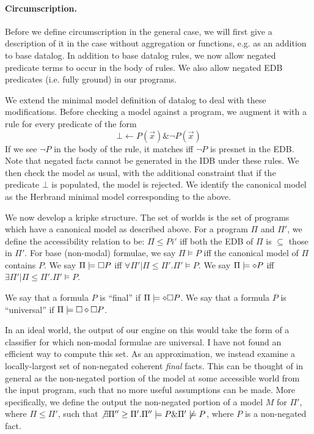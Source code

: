 \paragraph{Circumscription.}
Before we define circumscription in the general case, we will first give a description of it in the case without aggregation or functions, e.g. as an addition to base datalog.
In addition to base datalog rules, we now allow negated predicate terms to occur in the body of rules.
We also allow negated EDB predicates (i.e. fully ground) in our programs.

We extend the minimal model definition of datalog to deal with these modifications.
Before checking a model against a program, we augment it with a rule for every predicate of the form
\[
	\bot \leftarrow P(\vec{x}) \& \neg P(\vec{x})
\]
If we see $\neg P$ in the body of the rule, it matches iff $\neg P$ is presnet in the EDB.
Note that negated facts cannot be generated in the IDB under these rules.
We then check the model as usual, with the additional constraint that if the predicate $\bot$ is populated, the model is rejected.
We identify the canonical model as the Herbrand minimal model corresponding to the above.

We now develop a kripke structure.
The set of worlds is the set of programs which have a canonical model as described above.
For a program $\Pi$ and $\Pi'$, we define the accessibility relation to be: $\Pi \leq Pi'$ iff both the EDB of $\Pi$ is $\subseteq$ those in $\Pi'$.
For base (non-modal) formulae, we say $\Pi \models P$ iff the canonical model of $\Pi$ contains $P$.
We say $\Pi \models \square P$ iff $\forall \Pi' | \Pi \leq \Pi'. \Pi' \models P$.
We say $\Pi \models \diamond P$ iff $\exists \Pi' | \Pi \leq \Pi'. \Pi' \models P$.

We say that a formula $P$ is ``final'' if $\Pi \models \diamond \square P$.
We say that a formula $P$ is ``universal'' if $\Pi \models \square \diamond \square P$.

In an ideal world, the output of our engine on this would take the form of a classifier for which non-modal formulae are universal.
I have not found an efficient way to compute this set.
As an approximation, we instead examine a locally-largest set of non-negated coherent \emph{final} facts.
This can be thought of in general as the non-negated portion of the model at some accessible world from the input program, such that no more useful assumptions can be made.
More specifically, we define the output the non-negated portion of a model $M$ for $\Pi'$, where $\Pi \leq \Pi'$, such that $\not \exists \Pi'' \geq \Pi'. \Pi'' \models P \& \Pi' \not \models P$, where $P$ is a non-negated fact.

